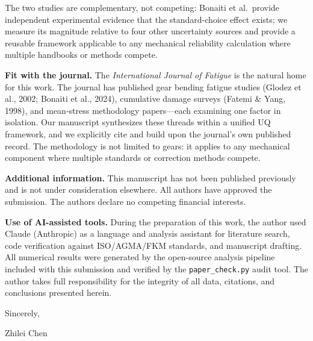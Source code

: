 \documentclass[12pt,a4paper]{article}
\begin{document}
The two studies are complementary, not competing: Bonaiti et al.\ provide
independent experimental evidence that the standard-choice effect exists; we
measure its magnitude relative to four other uncertainty sources and provide
a reusable framework applicable to any mechanical reliability calculation
where multiple handbooks or methods compete.

\vspace{0.3cm}
\noindent\textbf{Fit with the journal.}
The \textit{International Journal of Fatigue} is the natural home for this
work. The journal has published gear bending fatigue studies (Glodez et al.,
2002; Bonaiti et al., 2024), cumulative damage surveys (Fatemi \& Yang, 1998),
and mean-stress methodology papers---each examining one factor in
isolation. Our manuscript synthesizes these threads within a unified UQ
framework, and we explicitly cite and build upon the journal's own
published record. The methodology is not limited to gears: it applies to
any mechanical component where multiple standards or correction methods
compete.

\vspace{0.3cm}
\noindent\textbf{Additional information.}
This manuscript has not been published previously and is not under
consideration elsewhere. All authors have approved the submission. The
authors declare no competing financial interests.

\vspace{0.3cm}
\noindent\textbf{Use of AI-assisted tools.}
During the preparation of this work, the author used Claude (Anthropic)
as a language and analysis assistant for literature search,
code verification against ISO/AGMA/FKM standards, and manuscript drafting.
All numerical results were generated by the open-source analysis pipeline
included with this submission and verified by the \texttt{paper\_check.py}
audit tool. The author takes full responsibility for the integrity of all
data, citations, and conclusions presented herein.

\vspace{1cm}
\noindent Sincerely,

\vspace{1.5cm}
\noindent Zhilei Chen
\end{document}
